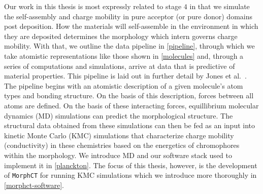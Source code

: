 
Our work in this thesis
is most expressly related to stage $4$ in that we simulate the self-assembly and
charge mobility in pure acceptor (or
pure donor) domains post deposition. 
How the materials will self-assemble in the environment in which they are deposited determines
the morphology which intern governs charge mobility. 
With that, we outline the data pipeline in \autoref{pipeline}, through which we take atomistic representations like
those shown in \autoref{molecules} and, through a series of computations and simulations,
arrive at data that is predictive of material properties. 
This pipeline is laid out in further detail by Jones et al.~\cite{jones2017}.
The pipeline begins with an atomistic description of a given molecule's atom types and bonding structure.
On the basis of this description, forces between all atoms are defined. On the basis of these interacting
forces, equillibrium molecular dynamics (MD) simulations can predict the morphological structure. 
The structural data obtained from these simulations can then be fed as an input into kinetic Monte
Carlo (KMC) simulations that characterize charge mobility (conductivity) in these chemistries based on the
energetics of chromophores within the morphology.
We introduce MD and our software stack used to implement it in \autoref{planckton}. 
The focus of this thesis, however, is the development of \texttt{MorphCT} for running KMC simulations which we
introduce more thoroughly in 
\autoref{morphct-software}.

